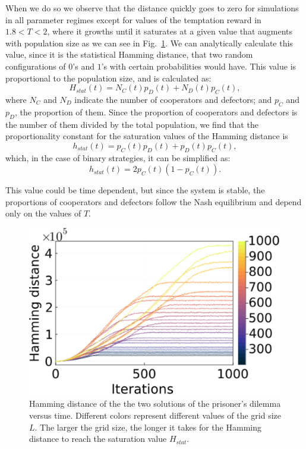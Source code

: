 When we do so we observe that the distance quickly goes to zero for simulations in all parameter regimes except for values of the temptation reward in $1.8 < T < 2$, where it growths until it saturates at a given value that augments with population size as we can see in Fig.~\ref{fig:HammingTimePopulation_PD}. We can analytically calculate this value, since it is the statistical Hamming distance, that two random configurations of $0$'s and $1$'s with certain probabilities would have. This value is proportional to the population size, and is calculated as:
\begin{equation}
H_{stat}(t)=N_C(t)p_D(t)+N_D(t)p_C(t),
\end{equation} 
where $N_C$ and $N_D$ indicate the number of cooperators and defectors; and $p_C$ and $p_D$, the proportion of them. Since the proportion of cooperators and defectors is the number of them divided by the total population, we find that the 
proportionality constant for the saturation values of the Hamming distance is
\begin{equation}
h_{stat}(t)=p_C(t)p_D(t)+p_D(t)p_C(t),
\end{equation} 
which, in the case of binary strategies, it can be simplified as:
\begin{equation}
h_{stat}(t)=2p_C(t)(1-p_C(t)).
\end{equation} 

This value could be time dependent, but since the system is stable, the proportions of cooperators and defectors follow the Nash equilibrium and depend only on the values of $T$.



\begin{figure}
	\centering
	\includegraphics[width=0.8\linewidth]{Images/P3/HammingTimePopulation_PD.eps}
	\caption{Hamming distance of the the two solutions of the prisoner's dilemma versus time. Different colors represent different values of the grid size $L$. The larger the grid size, the longer it takes for the Hamming distance to reach the saturation value $H_{stat}$.}
	\label{fig:HammingTimePopulation_PD}
\end{figure}






